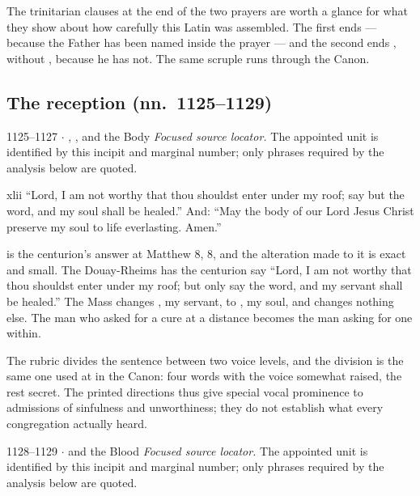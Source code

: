 The trinitarian clauses at the end of the two prayers are worth a glance for
what they show about how carefully this Latin was assembled. The first ends
 ---
 because the Father has been named inside the prayer --- and the
second ends , without , because he has not. The same scruple runs
through the Canon.

\subsection*{The reception (nn.~1125--1129)}

\begin{appointed}{1125--1127 $\cdot$ , , and the Body}
\textit{Focused source locator.} The appointed unit is identified by this incipit and marginal number; only phrases required by the analysis below are quoted.
\end{appointed}

\begin{englishwitness}{xlii}
``Lord, I am not worthy that thou shouldst enter under my roof; say but the
word, and my soul shall be healed.'' And: ``May the body of our Lord Jesus
Christ preserve my soul to life everlasting. Amen.''
\end{englishwitness}

 is the centurion's answer at Matthew 8, 8, and
the alteration made to it is exact and small. The Douay-Rheims has the centurion
say ``Lord, I am not worthy that thou shouldst enter under my roof; but only
say the word, and my servant shall be healed.'' The Mass changes
, my servant, to , my soul, and changes
nothing else. The man who asked for a cure at a distance becomes the man asking
for one within.

The rubric divides the sentence between two voice levels, and the division is
the same one used at  in the Canon: four
words with the voice somewhat raised, the rest secret. The printed directions
thus give special vocal prominence to admissions of sinfulness and
unworthiness; they do not establish what every congregation actually heard.

\begin{appointed}{1128--1129 $\cdot$  and the Blood}
\textit{Focused source locator.} The appointed unit is identified by this incipit and marginal number; only phrases required by the analysis below are quoted.
\end{appointed}

